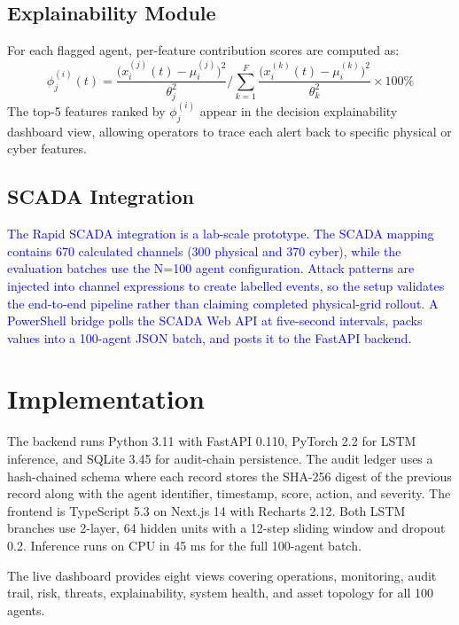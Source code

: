 \documentclass[conference,a4paper]{IEEEtran}
\begin{document}
\subsection{Explainability Module}

For each flagged agent, per-feature contribution scores are computed as:
\begin{equation}
\phi_j^{(i)}(t) = \frac{\bigl(x_i^{(j)}(t) - \mu_i^{(j)}\bigr)^2}{\theta_j^2} \Bigg/ \sum_{k=1}^{F} \frac{\bigl(x_i^{(k)}(t) - \mu_i^{(k)}\bigr)^2}{\theta_k^2} \times 100\%
\label{eq:explain}
\end{equation}
The top-5 features ranked by $\phi_j^{(i)}$ appear in the decision explainability dashboard view, allowing operators to trace each alert back to specific physical or cyber features.

\subsection{SCADA Integration}

\textcolor{blue}{The Rapid SCADA integration is a lab-scale prototype. The SCADA mapping contains 670 calculated channels (300 physical and 370 cyber), while the evaluation batches use the N=100 agent configuration. Attack patterns are injected into channel expressions to create labelled events, so the setup validates the end-to-end pipeline rather than claiming completed physical-grid rollout. A PowerShell bridge polls the SCADA Web API at five-second intervals, packs values into a 100-agent JSON batch, and posts it to the FastAPI backend.}

\section{Implementation}

The backend runs Python 3.11 with FastAPI 0.110, PyTorch 2.2 for LSTM inference, and SQLite 3.45 for audit-chain persistence. The audit ledger uses a hash-chained schema where each record stores the SHA-256 digest of the previous record along with the agent identifier, timestamp, score, action, and severity. The frontend is TypeScript 5.3 on Next.js 14 with Recharts 2.12. Both LSTM branches use 2-layer, 64 hidden units with a 12-step sliding window and dropout 0.2. Inference runs on CPU in 45 ms for the full 100-agent batch.

The live dashboard provides eight views covering operations, monitoring, audit trail, risk, threats, explainability, system health, and asset topology for all 100 agents.
\end{document}
